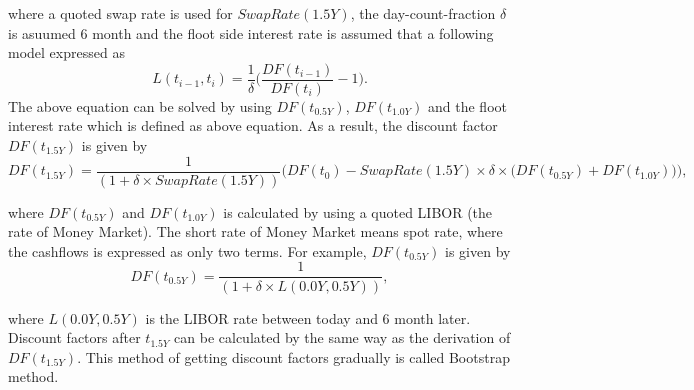 \documentclass[11pt]{article}
\begin{document}
where a quoted swap rate is used for \(SwapRate(1.5Y)\), the
day-count-fraction \(\delta\) is asuumed 6 month and the floot side
interest rate is assumed that a following model expressed as \[
L(t_{i-1}, t_{i}) = \frac{1}{\delta} \Big( \frac{ DF(t_{i-1}) }{ DF(t_{i}) } - 1 \Big).
\] The above equation can be solved by using \(DF(t_{0.5Y})\),
\(DF(t_{1.0Y})\) and the floot interest rate which is defined as above
equation. As a result, the discount factor \(DF(t_{1.5Y})\) is given by
\[
DF(t_{1.5Y}) = \frac{1}{(1 + \delta \times SwapRate(1.5Y))} \Big( DF(t_{0}) - SwapRate(1.5Y) \times \delta \times \big(DF(t_{0.5Y}) + DF(t_{1.0Y}) \big) \Big),
\]

where \(DF(t_{0.5Y})\) and \(DF(t_{1.0Y})\) is calculated by using a
quoted LIBOR (the rate of Money Market). The short rate of Money Market
means spot rate, where the cashflows is expressed as only two terms. For
example, \(DF(t_{0.5Y})\) is given by \[
DF(t_{0.5Y}) = \frac{1}{( 1 + \delta \times L(0.0Y, 0.5Y))},
\]

where \(L(0.0Y, 0.5Y)\) is the LIBOR rate between today and 6 month
later. Discount factors after \(t_{1.5Y}\) can be calculated by the same
way as the derivation of \(DF(t_{1.5Y})\). This method of getting
discount factors gradually is called Bootstrap method.

\href{Continuously,\%20let\%20us\%20consider\%20a\%20T/N\%20swap\%20trade.\%20When\%20$V\%20=\%200$\%20under\%20the\%20swap\%20pricing\%20formula,\%20it\%20is\%20written\%20by\%20$$\%20FixedRate(T/N)\%20(\%20DF(t_\%7BO/N\%7D)\%20/times\%20/delta_\%7B1\%7D\%20+\%20DF(t_\%7BT/N\%7D)\%20/times\%20/delta_\%7B2\%7D\%20)\%20/\%20=\%20(\%20DF(t_\%7BO/N\%7D)\%20-\%20DF(t_\%7B0\%7D)\%20)\%20/delta_\%7B1\%7D\%20+\%20(DF(t_\%7BT/N\%7D)\%20-\%20DF(t_\%7BO/N\%7D))\%20/delta_\%7B2\%7D,\%20$$\%20where\%20$/delta_2$\%20is\%20a\%20day-count-fraction\%20between\%20$t_\%7BO/N\%7D$\%20and\%20$t_\%7BT/N\%7D$\%20and\%20a\%20quoted\%20Tomorrow-Next\%20Rate\%20is\%20used\%20for\%20$FixedRate(T/N)$.\%20This\%20equation\%20can\%20be\%20solved\%20for\%20$DF(t_\%7BT/N\%7D)$\%20by\%20using\%20$DF(t_\%7BO/N\%7D)$\%20which\%20is\%20derived\%20from\%20the\%20above\%20equation.\%20In\%20this\%20way,\%20discount\%20factors\%20at\%20each\%20tenor\%20is\%20calculated.\%20This\%20method\%20for\%20getiing\%20discount\%20factors\%20is\%20called\%20as\%20Bootstrap\%20method.\%20The\%20expression\%20of\%20$DF(t_\%7BT/N\%7D)$\%20is\%20given\%20by\%20$$\%20DF(t_\%7BT/N\%7D)\%20=\%20/frac\%7B\%20FixedRate(T/N)/times\%20DF(t_\%7BO/N\%7D)\%20+\%20DF(t_0)\%20\%7D\%7B\%201\%20-\%20FixedRate(T/N)\%20\%7D\%20$$\%20''}{}
\end{document}
